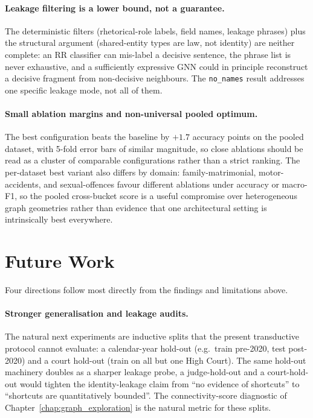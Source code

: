 \paragraph{Leakage filtering is a lower bound, not a guarantee.} The
deterministic filters (rhetorical-role labels, field names, leakage
phrases) plus the structural argument (shared-entity types are law,
not identity) are neither complete: an RR classifier can mis-label a
decisive sentence, the phrase list is never exhaustive, and a
sufficiently expressive GNN could in principle reconstruct a decisive
fragment from non-decisive neighbours. The \texttt{no\_names} result
addresses one specific leakage mode, not all of them.

\paragraph{Small ablation margins and non-universal pooled optimum.}
The best configuration beats the baseline by $+1.7$ accuracy points
on the pooled dataset, with 5-fold error bars of similar magnitude,
so close ablations should be read as a cluster of comparable
configurations rather than a strict ranking. The per-dataset best
variant also differs by domain: family-matrimonial, motor-accidents,
and sexual-offences favour different ablations under accuracy or
macro-F1, so the pooled cross-bucket score is a useful compromise
over heterogeneous graph geometries rather than evidence that one
architectural setting is intrinsically best everywhere.

\section{Future Work}

Four directions follow most directly from the findings and
limitations above.

\paragraph{Stronger generalisation and leakage audits.} The natural
next experiments are inductive splits that the present transductive
protocol cannot evaluate: a calendar-year hold-out (e.g.\ train
pre-2020, test post-2020) and a court hold-out (train on all but one
High Court). The same hold-out machinery doubles as a sharper
leakage probe, a judge-hold-out and a court-hold-out would tighten
the identity-leakage claim from ``no evidence of shortcuts'' to
``shortcuts are quantitatively bounded''. The connectivity-score
diagnostic of Chapter~\ref{chap:graph_exploration} is the natural
metric for these splits.

